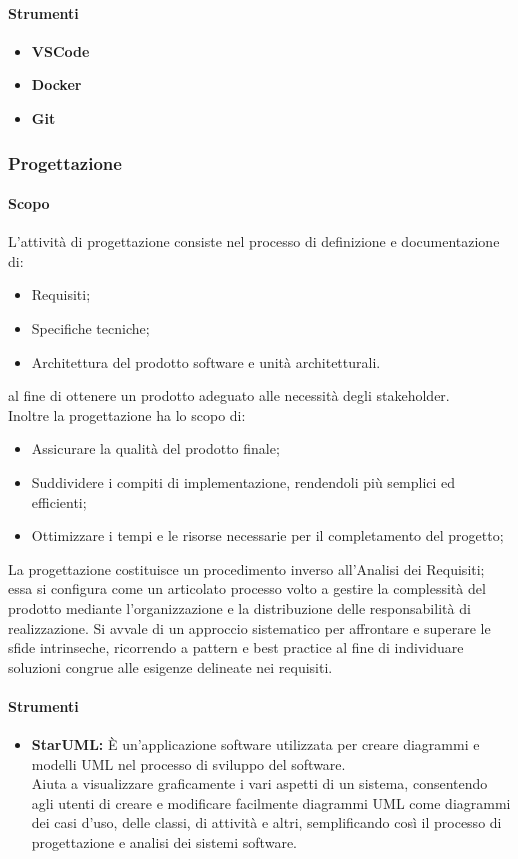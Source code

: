 \documentclass{article}
\begin{document}
\paragraph{Strumenti}
\begin{itemize}
    \item \textbf{VSCode}
    \item \textbf{Docker}
    \item \textbf{Git}
\end{itemize}
\subsubsection{Progettazione} 
\paragraph{Scopo}
L'attività di progettazione consiste nel processo di definizione e documentazione di:
\begin{itemize}
    \item Requisiti;
    \item Specifiche tecniche;
    \item Architettura del prodotto software e unità architetturali.
\end{itemize}
al fine di ottenere un prodotto adeguato alle necessità degli stakeholder. \\ 
Inoltre la progettazione ha lo scopo di:
\begin{itemize}
    \item Assicurare la qualità del prodotto finale;
    \item Suddividere i compiti di
    implementazione, rendendoli più semplici ed efficienti;
    \item Ottimizzare i tempi e le risorse necessarie per il completamento del progetto;
\end{itemize}

La progettazione costituisce un procedimento inverso all'Analisi dei Requisiti; essa si configura come un articolato processo volto a gestire la complessità del prodotto mediante l'organizzazione e la distribuzione delle responsabilità di realizzazione. Si avvale di un approccio sistematico per affrontare e superare le sfide intrinseche, ricorrendo a pattern e best practice al fine di individuare soluzioni congrue alle esigenze delineate nei requisiti.

\paragraph{Strumenti}
\begin{itemize}
    \item \textbf{StarUML:} 
    È un'applicazione software utilizzata per creare diagrammi e modelli UML nel processo di sviluppo del software. \\
    Aiuta a visualizzare graficamente i vari aspetti di un sistema, consentendo agli utenti di creare e modificare facilmente diagrammi UML come diagrammi dei casi d'uso, delle classi, di attività e altri, semplificando così il processo di progettazione e analisi dei sistemi software.
\end{itemize}
\end{document}
